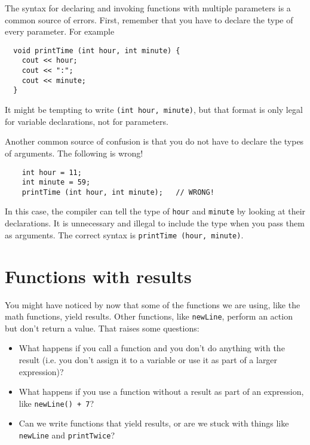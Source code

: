 The syntax for declaring and invoking functions with multiple
parameters is a common source of errors.  First, remember
that you have to declare the type of every parameter.  For
example

\begin{lstlisting}
  void printTime (int hour, int minute) {
    cout << hour;
    cout << ":";
    cout << minute;
  }
\end{lstlisting}
%
It might be tempting to write {\tt (int hour, minute)}, but
that format is only legal for variable declarations, not
for parameters.

Another common source of confusion is that you do not have
to declare the types of arguments.  The following is wrong!

\begin{lstlisting}
    int hour = 11;
    int minute = 59;
    printTime (int hour, int minute);   // WRONG!
\end{lstlisting}
%
In this case, the compiler can tell the type of {\tt hour}
and {\tt minute} by looking at their declarations.  It is
unnecessary and illegal to include the type when you pass them
as arguments.  The correct
syntax is {\tt printTime (hour, minute)}.

\section {Functions with results}

You might have noticed by now that some of the functions we are using,
like the math functions, yield results.  Other functions,
like {\tt newLine}, perform an action but
don't return a value.  That raises some questions:

\begin{itemize}

\item What happens if you call a function and you don't
do anything with the result (i.e. you don't assign it to
a variable or use it as part of a larger expression)?

\item What happens if you use a function without a result as part
of an expression, like {\tt newLine() + 7}?

\item Can we write functions that yield results, or are we
stuck with things like {\tt newLine} and {\tt printTwice}?

\end{itemize}

